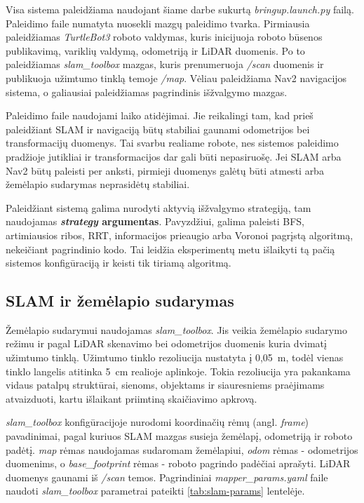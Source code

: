 \documentclass[]{VUMIFTemplateClass}
\begin{document}
Visa sistema paleidžiama naudojant šiame darbe sukurtą \textit{bringup.launch.py} failą. Paleidimo faile numatyta nuosekli mazgų paleidimo tvarka. Pirmiausia paleidžiamas
\textit{TurtleBot3} roboto valdymas, kuris inicijuoja roboto būsenos publikavimą, variklių valdymą, odometriją ir LiDAR duomenis. Po to paleidžiamas
\textit{slam\_toolbox} mazgas, kuris prenumeruoja \textit{/scan} duomenis ir publikuoja užimtumo tinklą temoje \textit{/map}. Vėliau paleidžiama Nav2
navigacijos sistema, o galiausiai paleidžiamas pagrindinis išžvalgymo mazgas.

Paleidimo faile naudojami laiko atidėjimai. Jie reikalingi tam, kad prieš paleidžiant SLAM ir navigaciją būtų stabiliai gaunami odometrijos bei transformacijų
duomenys. Tai svarbu realiame robote, nes sistemos paleidimo pradžioje jutikliai ir transformacijos dar gali būti nepasiruošę. Jei SLAM arba Nav2 būtų
paleisti per anksti, pirmieji duomenys galėtų būti atmesti arba žemėlapio sudarymas neprasidėtų stabiliai.

Paleidžiant sistemą galima nurodyti aktyvią išžvalgymo strategiją, tam naudojamas \textbf{\textit{strategy} argumentas}. Pavyzdžiui, galima paleisti BFS, artimiausios
ribos, RRT, informacijos prieaugio arba Voronoi pagrįstą algoritmą, nekeičiant pagrindinio kodo. Tai leidžia eksperimentų metu išlaikyti tą pačią sistemos
konfigūraciją ir keisti tik tiriamą algoritmą.

\subsection{SLAM ir žemėlapio sudarymas}

Žemėlapio sudarymui naudojamas \textit{slam\_toolbox}. Jis veikia žemėlapio sudarymo režimu ir pagal LiDAR skenavimo bei odometrijos duomenis kuria dvimatį
užimtumo tinklą. Užimtumo tinklo rezoliucija nustatyta į 0,05~m, todėl vienas tinklo langelis atitinka 5~cm realioje aplinkoje. Tokia rezoliucija yra
pakankama vidaus patalpų struktūrai, sienoms, objektams ir siauresniems praėjimams atvaizduoti, kartu išlaikant priimtiną skaičiavimo apkrovą.

\textit{slam\_toolbox} konfigūracijoje nurodomi koordinačių rėmų (angl. \textit{frame}) pavadinimai, pagal kuriuos SLAM mazgas susieja žemėlapį, odometriją ir
roboto padėtį. \textit{map} rėmas naudojamas sudaromam žemėlapiui, \textit{odom} rėmas - odometrijos duomenims, o \textit{base\_footprint} rėmas - roboto pagrindo padėčiai
aprašyti. LiDAR duomenys gaunami iš \textit{/scan} temos. Pagrindiniai \textit{mapper\_params.yaml} faile naudoti \textit{slam\_toolbox} parametrai pateikti
\ref{tab:slam-params} lentelėje.
\end{document}
